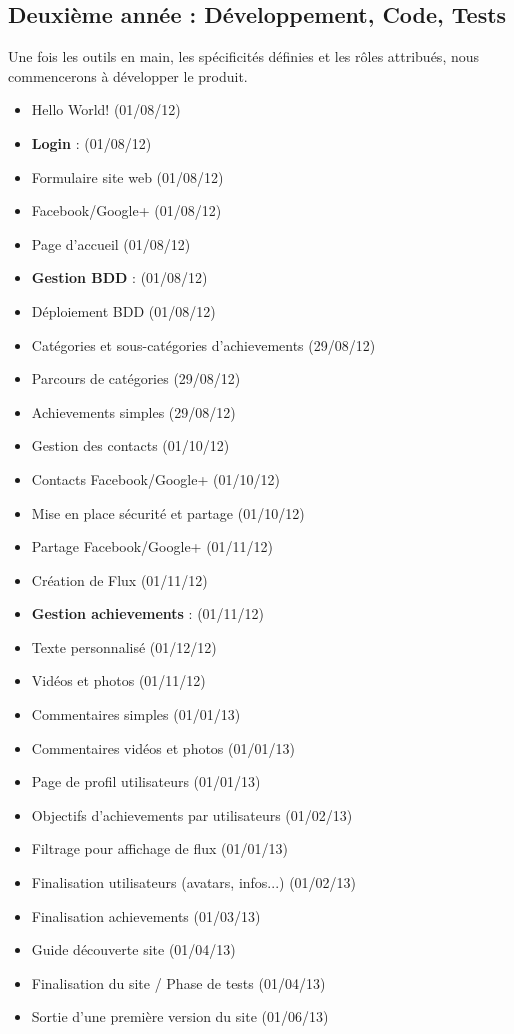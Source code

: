 \documentclass{life-fr}
\begin{document}
\subsection{ Deuxième année : Développement, Code, Tests}
Une fois les outils en main, les spécificités définies et les rôles attribués, nous commencerons à développer le produit.\\
\begin{itemize}
  \item Hello World! (01/08/12)
  \item \textbf{Login} : (01/08/12)
  \item Formulaire site web (01/08/12)
  \item Facebook/Google+ (01/08/12)
  \item Page d'accueil (01/08/12)
  \item \textbf{Gestion BDD} : (01/08/12)
  \item Déploiement BDD (01/08/12)
  \item Catégories et sous-catégories d'achievements (29/08/12)
  \item Parcours de catégories (29/08/12)
  \item Achievements simples (29/08/12)
  \item Gestion des contacts (01/10/12)
  \item Contacts Facebook/Google+ (01/10/12)
  \item Mise en place sécurité et partage (01/10/12)
  \item Partage Facebook/Google+ (01/11/12)
  \item Création de Flux (01/11/12)
  \item \textbf{Gestion achievements} : (01/11/12)
  \item Texte personnalisé (01/12/12)
  \item Vidéos et photos (01/11/12)
  \item Commentaires simples (01/01/13)
  \item Commentaires vidéos et photos (01/01/13)
  \item Page de profil utilisateurs (01/01/13)
  \item Objectifs d'achievements par utilisateurs (01/02/13)
  \item Filtrage pour affichage de flux (01/01/13)
  \item Finalisation utilisateurs (avatars, infos...) (01/02/13)
  \item Finalisation achievements (01/03/13)
  \item Guide découverte site (01/04/13)
  \item Finalisation du site / Phase de tests (01/04/13)
  \item Sortie d'une première version du site (01/06/13)
\end{itemize}
\end{document}
